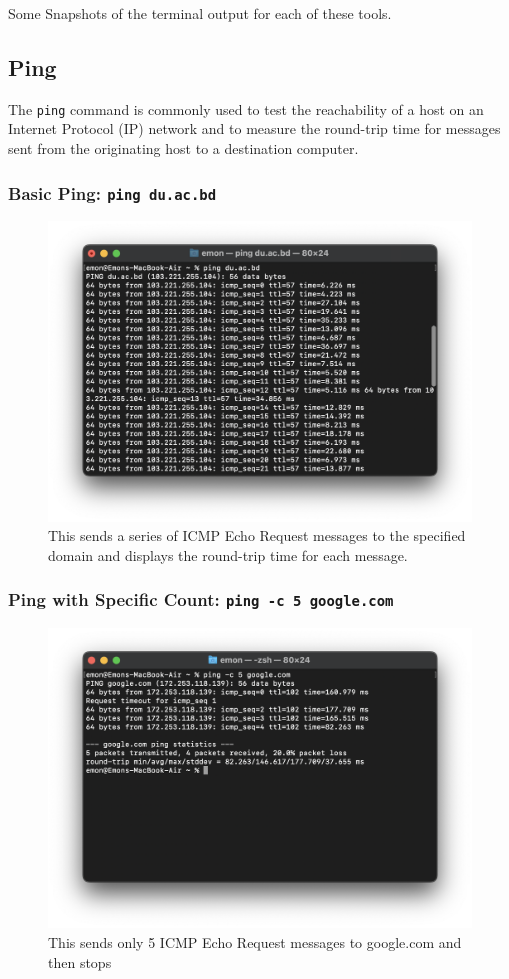\documentclass[11pt]{article}
\newcommand{\terminal}[1]{\texttt{\color{terminalcolor}#1}}
\begin{document}
Some Snapshots of the terminal output for each of these tools. 

\subsection{Ping}
The \terminal{ping} command is commonly used to test the reachability of a host on an Internet Protocol (IP) network and to measure the round-trip time for messages sent from the originating host to a destination computer.
\subsubsection{Basic Ping: \terminal{ping du.ac.bd}}
\begin{figure}[!h]
    \centering
    \includegraphics[width=\textwidth]{ping1.png}
    \caption{This sends a series of ICMP Echo Request messages to the specified domain and displays the round-trip time for each message.}
\end{figure}

\newpage
\subsubsection{Ping with Specific Count: \terminal{ping -c 5 google.com}}
\begin{figure}[!h]
    \centering
    \includegraphics[width=\textwidth]{ping2.png}
    \caption{This sends only 5 ICMP Echo Request messages to google.com and then stops}
\end{figure}
\end{document}
